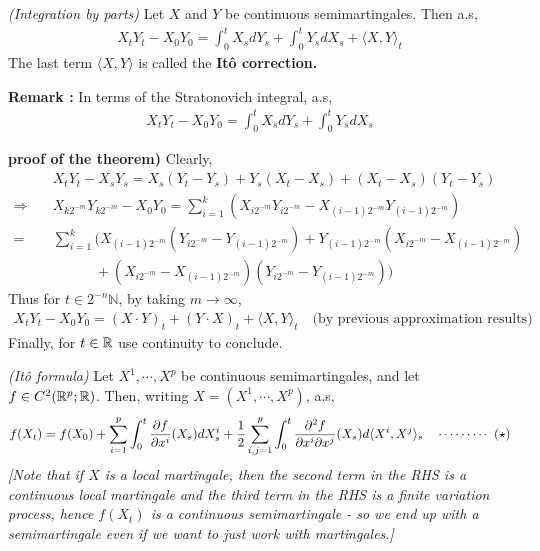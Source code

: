\documentclass[12pt,a4paper]{article}
\newenvironment{proof}
{\begin{changemargin}{0.5cm}{0.5cm} 
	}%
	{\end{changemargin}
}
\newenvironment{p}
{\begin{proof} 
	}%
	{\end{proof}
}
\begin{document}
\thm \emph{(Integration by parts)} Let $X$ and $Y$ be continuous semimartingales. Then a.s,
\begin{align*}
X_t Y_t - X_0 Y_0 = \int_0^t X_s dY_s + \int_0^t Y_s dX_s + \langle X, Y \rangle_t
\end{align*}
The last term $\langle X, Y \rangle$ is called the \textbf{It\^o correction.}
\s

\textbf{Remark :} In terms of the Stratonovich integral, a.s,
\begin{align*}
X_t Y_t - X_0 Y_0 = \int_0^t X_s dY_s + \int_0^t Y_s dX_s
\end{align*}
\begin{p}
\textbf{proof of the theorem)} Clearly,
\begin{align*}
& X_t Y_t - X_s Y_s = X_s(Y_t -Y_s) + Y_s (X_t -X_s) + (X_t -X_s)(Y_t-Y_s) \\
\Rightarrow \quad  & X_{k2^{-m}} Y_{k2^{-m}} - X_0 Y_0 = \sum_{i=1}^k ( X_{i2^{-m}} Y_{i2^{-m}} - X_{(i-1)2^{-m}} Y_{(i-1)2^{-m}}) \\
= & \sum_{i=1}^k \Big(  X_{(i-1)2^{-m}}(Y_{i2^{-m}} - Y_{(i-1)2^{-m}}) + Y_{(i-1)2^{-m}}(X_{i2^{-m}} -X_{(i-1)2^{-m}}) \\
& \quad \quad\quad + (X_{i2^{-m}} - X_{(i-1)2^{-m}})(Y_{i2^{-m}} - Y_{(i-1)2^{-m}}) \Big)
\end{align*}
Thus for $t\in 2^{-n} \mathbb{N}$, by taking $m\rightarrow \infty$,
\begin{align*}
X_t Y_t - X_0 Y_0 = (X\cdot Y)_t + (Y \cdot X)_t + \langle X, Y \rangle_t \quad \text{(by previous approximation results)}
\end{align*}
Finally, for $t\in \mathbb{R}$ use continuity to conclude.

\eop
\end{p}
\s

\thm \emph{(It\^o formula)} Let $X^1, \cdots, X^p$ be continuous semimartingales, and let $f \in C^2(\mathbb{R}^p ; \mathbb{R})$. Then, writing $X = (X^1, \cdots, X^p)$, a.s,
\begin{align*}
f(X_t) =  f(X_0) + \sum_{i=1}^p \int_0^t \frac{\partial f}{\partial x^i}(X_s)dX_s^i + \frac{1}{2} \sum_{i,j=1}^p \int_0^t \frac{\partial^2 f}{\partial x^i \partial x^j} (X_s) d\langle X^i, X^j \rangle_s \quad \cdots\cdots\cdots\,\,(\star)
\end{align*}
\emph{[Note that if $X$ is a local martingale, then the second term in the RHS is a continuous local martingale and the third term in the RHS is a finite variation process, hence $f(X_t)$ is a continuous semimartingale - so we end up with a semimartingale even if we want to just work with martingales.]}
\end{document}
